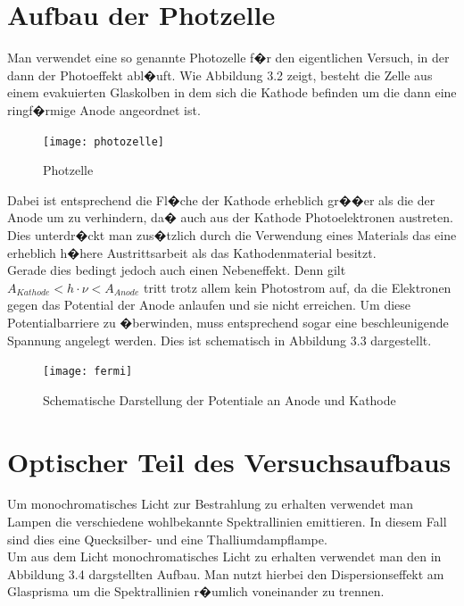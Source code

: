 \documentclass[a4paper, 10pt]{report}%
\begin{document}
\section{Aufbau der Photzelle}
Man verwendet eine so genannte Photozelle f�r den eigentlichen Versuch, in der dann der Photoeffekt abl�uft. Wie Abbildung 3.2 zeigt, besteht die Zelle aus einem evakuierten Glaskolben in dem sich die Kathode befinden um die dann eine ringf�rmige Anode angeordnet ist.
\begin{figure}[!htbp]
	\begin{center}
		\texttt{[image: photozelle]}
	\end{center}
	\caption{Photzelle}
	\label{fig:abbildung2}
\end{figure}
Dabei ist entsprechend die Fl�che der Kathode erheblich gr��er als die der Anode um zu verhindern, da� auch aus der Kathode Photoelektronen austreten. Dies unterdr�ckt man zus�tzlich durch die Verwendung eines Materials das eine erheblich h�here Austrittsarbeit als das Kathodenmaterial besitzt.\\
Gerade dies bedingt jedoch auch einen Nebeneffekt. Denn gilt $A_{Kathode} < h \cdot \nu <  A_{Anode}$ tritt trotz allem kein Photostrom auf, da die Elektronen gegen das Potential der Anode anlaufen und sie nicht erreichen. Um diese Potentialbarriere zu �berwinden, muss entsprechend sogar eine beschleunigende Spannung angelegt werden. Dies ist schematisch in Abbildung 3.3 dargestellt.\\

\begin{figure}[!htbp]
	\begin{center}
		\texttt{[image: fermi]}
	\end{center}
	\caption{Schematische Darstellung der Potentiale an Anode und Kathode}
	\label{fig:abbildung3}
\end{figure}

\section{Optischer Teil des Versuchsaufbaus}
Um monochromatisches Licht zur Bestrahlung zu erhalten verwendet man Lampen die verschiedene wohlbekannte Spektrallinien emittieren. In diesem Fall sind dies eine Quecksilber- und eine Thalliumdampflampe.\\
Um aus dem Licht monochromatisches Licht zu erhalten verwendet man den in Abbildung 3.4 dargstellten Aufbau. Man nutzt hierbei den Dispersionseffekt am Glasprisma um die Spektrallinien r�umlich voneinander zu trennen. 
\end{document}
